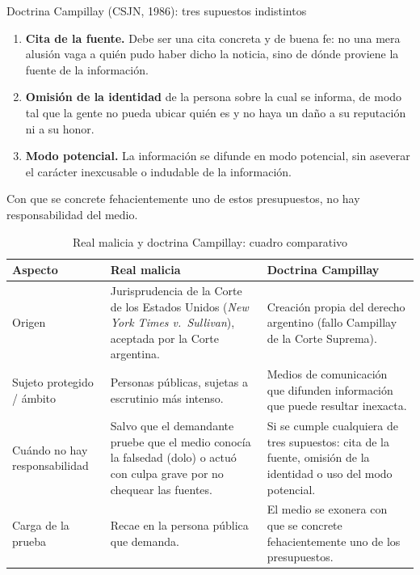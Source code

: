 \documentclass[12pt,oneside]{book}
\begin{document}
\begin{definition}{Doctrina Campillay (CSJN, 1986): tres supuestos indistintos}
\begin{enumerate}
\item \textbf{Cita de la fuente.} Debe ser una cita concreta y de buena fe: no una mera alusión vaga a quién pudo haber dicho la noticia, sino de dónde proviene la fuente de la información.
\item \textbf{Omisión de la identidad} de la persona sobre la cual se informa, de modo tal que la gente no pueda ubicar quién es y no haya un daño a su reputación ni a su honor.
\item \textbf{Modo potencial.} La información se difunde en modo potencial, sin aseverar el carácter inexcusable o indudable de la información.
\end{enumerate}
Con que se concrete fehacientemente uno de estos presupuestos, no hay responsabilidad del medio.
\end{definition}

\begin{table}[H]
\centering
\caption{Real malicia y doctrina Campillay: cuadro comparativo}
\begin{tabularx}{\textwidth}{>{\raggedright\arraybackslash}p{} X X}
\toprule
\textbf{Aspecto} & \textbf{Real malicia} & \textbf{Doctrina Campillay} \\
\midrule
Origen & Jurisprudencia de la Corte de los Estados Unidos (\emph{New York Times v.\ Sullivan}), aceptada por la Corte argentina. & Creación propia del derecho argentino (fallo Campillay de la Corte Suprema). \\
Sujeto protegido / ámbito & Personas públicas, sujetas a escrutinio más intenso. & Medios de comunicación que difunden información que puede resultar inexacta. \\
Cuándo no hay responsabilidad & Salvo que el demandante pruebe que el medio conocía la falsedad (dolo) o actuó con culpa grave por no chequear las fuentes. & Si se cumple cualquiera de tres supuestos: cita de la fuente, omisión de la identidad o uso del modo potencial. \\
Carga de la prueba & Recae en la persona pública que demanda. & El medio se exonera con que se concrete fehacientemente uno de los presupuestos. \\
\bottomrule
\end{tabularx}
\end{table}

\end{document}
